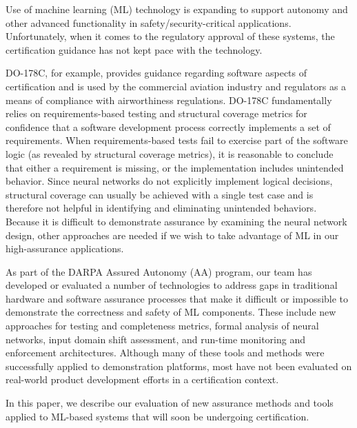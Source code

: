 Use of machine learning (ML) technology is expanding to support autonomy and other advanced functionality in safety/security-critical applications.  Unfortunately, when it comes to the regulatory approval of these systems, the certification guidance has not kept pace with the technology.

DO-178C, for example, provides guidance regarding software aspects of certification and is used by the commercial aviation industry and regulators as a means of compliance with airworthiness regulations. DO-178C fundamentally relies on requirements-based testing and structural coverage metrics for confidence that a software development process correctly implements a set of requirements. When requirements-based tests fail to exercise part of the software logic (as revealed by structural coverage metrics), it is reasonable to conclude that either a requirement is missing, or the implementation includes unintended behavior. Since neural networks do not explicitly implement logical decisions, structural coverage can usually be achieved with a single test case and is therefore not helpful in identifying and eliminating unintended behaviors.  Because it is difficult to demonstrate assurance by examining the neural network design, other approaches are needed if we wish to take advantage of ML in our high-assurance applications.

As part of the DARPA Assured Autonomy (AA) program, our team has developed or evaluated a number of technologies to address gaps in traditional hardware and software assurance processes that make it difficult or impossible to demonstrate the correctness and safety of ML components.    These include new approaches for testing and completeness metrics, formal analysis of neural networks, input domain shift assessment, and run-time monitoring and enforcement architectures.  Although many of these tools and methods were successfully applied to demonstration platforms, most have not been evaluated on real-world product development efforts in a certification context. 

In this paper, we describe our evaluation of new assurance methods and tools applied to ML-based systems that will soon be undergoing certification.